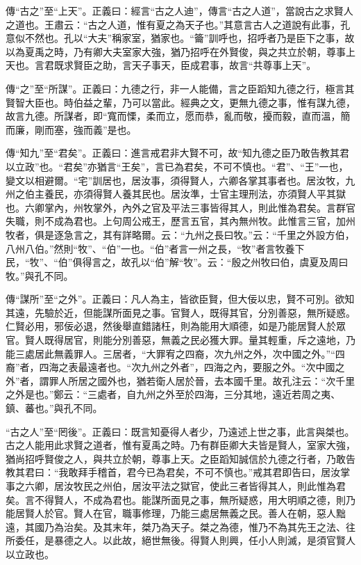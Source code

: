{\noindent\zhuan{}\fzbyks 傳“古之”至“上天”。正義曰：經言“古之人迪”，傳言“古之人道”，當說古之求賢人之道也。王肅云：“古之人道，惟有夏之為天子也。”其意言古人之道說有此事，孔意似不然也。孔以“大夫”稱家室，猶家也。“籥”訓呼也，招呼者乃是臣下之事，故以為夏禹之時，乃有卿大夫室家大強，猶乃招呼在外賢俊，與之共立於朝，尊事上天也。言君既求賢臣之助，言天子事天，臣成君事，故言“共尊事上天”。 \par}

{\noindent\zhuan{}\fzbyks 傳“之”至“所謀”。正義曰：九德之行，非一人能備，言之臣蹈知九德之行，極言其賢智大臣也。時伯益之輩，乃可以當此。經典之文，更無九德之事，惟有謀九德，故言九德。所謀者，即“寬而慄，柔而立，愿而恭，亂而敬，擾而毅，直而溫，簡而廉，剛而塞，強而義”是也。 \par}

{\noindent\zhuan{}\fzbyks 傳“知九”至“君矣”。正義曰：進言戒君非大賢不可，故“知九德之臣乃敢告教其君以立政”也。“君矣”亦猶言“王矣”，言已為君矣，不可不慎也。“君”、“王”一也，變文以相避爾。“宅”訓居也，居汝事，須得賢人，六卿各掌其事者也。居汝牧，九州之伯主養民，亦須得賢人養其民也。居汝準，士官主理刑法，亦須賢人平其獄也。六卿掌內，州牧掌外，內外之官及平法三事皆得其人，則此惟為君矣。言群官失職，則不成為君也。上句周公戒王，歷言五官，其內無州牧。此惟言三官，加州牧者，俱是逐急言之，其有詳略爾。云：“九州之長曰牧。”云：“千里之外設方伯，八州八伯。”然則“牧”、“伯”一也。“伯”者言一州之長，“牧”者言牧養下民，“牧”、“伯”俱得言之，故孔以“伯”解“牧”。云：“殷之州牧曰伯，虞夏及周曰牧。”與孔不同。 \par}

{\noindent\zhuan{}\fzbyks 傳“謀所”至“之外”。正義曰：凡人為主，皆欲臣賢，但大佞以忠，賢不可別。欲知其遠，先驗於近，但能謀所面見之事。官賢人，既得其官，分別善惡，無所疑惑。仁賢必用，邪佞必退，然後舉直錯諸枉，則為能用大順德，如是乃能居賢人於眾官。賢人既得居官，則能分別善惡，無義之民必獲大罪。量其輕重，斥之遠地，乃能三處居此無義罪人。三居者，“大罪宥之四裔，次九州之外，次中國之外。”“四裔”者，四海之表最遠者也。“次九州之外者”，四海之內，要服之外。“次中國之外”者，謂罪人所居之國外也，猶若衛人居於晉，去本國千里。故孔注云：“次千里之外是也。”鄭云：“三處者，自九州之外至於四海，三分其地，遠近若周之夷、鎮、蕃也。”與孔不同。 \par}

{\noindent\shu{}\fzkt “古之人”至“罔後”。正義曰：既言知憂得人者少，乃遠述上世之事，此言與桀也。古之人能用此求賢之道者，惟有夏禹之時。乃有群臣卿大夫皆是賢人，室家大強，猶尚招呼賢俊之人，與共立於朝，尊事上天。之臣蹈知誠信於九德之行者，乃敢告教其君曰：“我敢拜手稽首，君今已為君矣，不可不慎也。”戒其君即告曰，居汝掌事之六卿，居汝牧民之州伯，居汝平法之獄官，使此三者皆得其人，則此惟為君矣。言不得賢人，不成為君也。能謀所面見之事，無所疑惑，用大明順之德，則乃能居賢人於官。賢人在官，職事修理，乃能三處居無義之民。善人在朝，惡人黜遠，其國乃為治矣。及其末年，桀乃為天子。桀之為德，惟乃不為其先王之法、往所委任，是暴德之人。以此故，絕世無後。得賢人則興，任小人則滅，是須官賢人以立政也。 \par}

